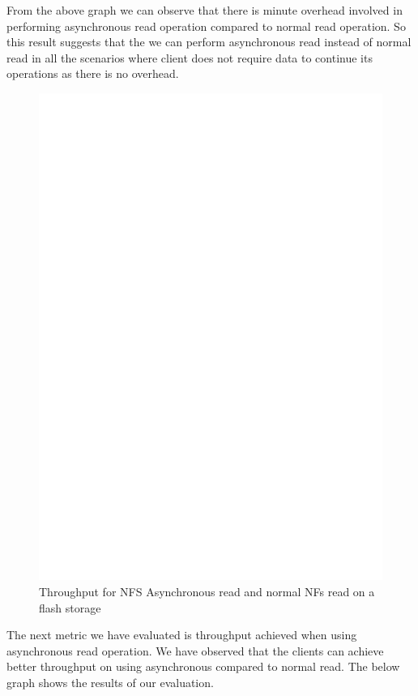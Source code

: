	From the above graph we can observe that there is minute overhead involved in performing asynchronous read operation compared to normal read operation. So this result suggests that the  we can perform asynchronous read instead of normal read in all the scenarios where client does not  require data to continue its operations as there is no overhead. 

\begin{figure}
\centering
\includegraphics[scale=0.6]{figures/performancesequence.eps}
\caption{Throughput for NFS Asynchronous read and normal NFs read on a flash storage}
\label{fig:performancesequence}
\end{figure}


	The next metric we have evaluated is throughput achieved when using asynchronous read operation. We have observed that the clients can achieve better throughput on using asynchronous compared to normal read. The below graph shows the results of our evaluation.



